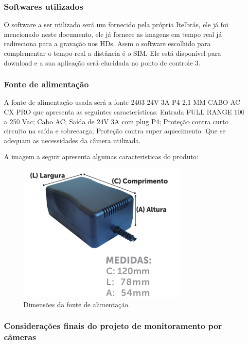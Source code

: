 \subsubsection{Softwares utilizados}
	
	O software a ser utilizado será um fornecido pela própria Itelbrás, ele já foi mencionado neste documento, ele já fornece as imagens em tempo real já redireciona para a gravação nos HDs. Assm o software escolhido para complementar o tempo real a distância é o SIM. Ele está disponível para download e a sua aplicação será elucidada no ponto de controle 3.

\subsubsection{Fonte de alimentação}

	A fonte de alimentação usada será a fonte 2403 24V 3A P4 2,1 MM CABO AC CX PRO que apresenta as seguintes características: Entrada FULL RANGE 100 a 250 Vac; Cabo AC; Saída de 24V 3A com plug P4;  Proteção contra curto circuito na saída e sobrecarga; Proteção contra super aquecimento. Que se adequam as necessidades da câmera utilizada.

A imagem a seguir apresenta algumas caracteristicas do produto:


	\begin{figure}[H]
	 \centering
	\label{Dimensões da fonte de alimentação}
	 \includegraphics[keepaspectratio=true,scale=0.8]{monitoramento/23.png}
	 \caption{Dimensões da fonte de alimentação.}
	\end{figure}
	

\subsubsection{Considerações finais do projeto de monitoramento por câmeras}

